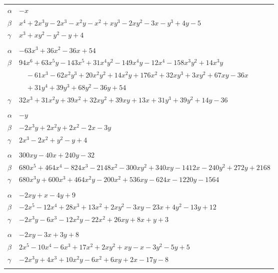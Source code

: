 \documentclass[11pt]{article}
\begin{document}
\begin{longtable}{@{}ll@{}}
$\alpha$ & $-x$\\
$\beta$ & $x^{4}+2x^{3}y-2x^{3}-x^{2}y-x^{2}+xy^{3}-2xy^{2}-3x-y^{3}+4y-5$\\
$\gamma$ & $x^{3}+xy^{2}-y^{2}-y+4$\\
\addlinespace[3pt]
\multicolumn{2}{@{}l}{$\{i,j\}=\{54,120\}$, $k_{ij}=2\cdot 3^{4}$}\\
$\alpha$ & $-63x^{3}+36x^{2}-36x+54$\\
$\beta$ & $94x^{6}+63x^{5}y-143x^{5}+31x^{4}y^{2}-149x^{4}y-12x^{4}-158x^{3}y^{2}+14x^{3}y$\\
 & $\quad -61x^{3}-62x^{2}y^{3}+20x^{2}y^{2}+14x^{2}y+176x^{2}+32xy^{3}+3xy^{2}+67xy-36x$\\
 & $\quad +31y^{4}+39y^{3}+68y^{2}-36y+54$\\
$\gamma$ & $32x^{3}+31x^{2}y+39x^{2}+32xy^{2}+39xy+13x+31y^{3}+39y^{2}+14y-36$\\
\addlinespace[3pt]
\multicolumn{2}{@{}l}{$\{i,j\}=\{58,59\}$, $k_{ij}=2^{2}$}\\
$\alpha$ & $-y$\\
$\beta$ & $-2x^{3}y+2x^{2}y+2x^{2}-2x-3y$\\
$\gamma$ & $2x^{3}-2x^{2}+y^{2}-y+4$\\
\addlinespace[3pt]
\multicolumn{2}{@{}l}{$\{i,j\}=\{59,166\}$, $k_{ij}=2^{3}\cdot 7\cdot 37$}\\
$\alpha$ & $300xy-40x+240y-32$\\
$\beta$ & $680x^{5}+464x^{4}-824x^{3}-2148x^{2}-300xy^{2}+340xy-1412x-240y^{2}+272y+2168$\\
$\gamma$ & $680x^{3}y+600x^{3}+464x^{2}y-200x^{2}+536xy-624x-1220y-1564$\\
\addlinespace[3pt]
\multicolumn{2}{@{}l}{$\{i,j\}=\{59,167\}$, $k_{ij}=2\cdot 3\cdot 7$}\\
$\alpha$ & $-2xy+x-4y+9$\\
$\beta$ & $-2x^{5}-12x^{4}+28x^{3}+13x^{2}+2xy^{2}-3xy-23x+4y^{2}-13y+12$\\
$\gamma$ & $-2x^{3}y-6x^{3}-12x^{2}y-22x^{2}+26xy+8x+y+3$\\
\addlinespace[3pt]
\multicolumn{2}{@{}l}{$\{i,j\}=\{59,169\}$, $k_{ij}=3\cdot 7$}\\
$\alpha$ & $-2xy-3x+3y+8$\\
$\beta$ & $2x^{5}-10x^{4}-6x^{3}+17x^{2}+2xy^{2}+xy-x-3y^{2}-5y+5$\\
$\gamma$ & $-2x^{3}y+4x^{3}+10x^{2}y-6x^{2}+6xy+2x-17y-8$\\
\addlinespace[3pt]
\multicolumn{2}{@{}l}{$\{i,j\}=\{62,91\}$, $k_{ij}=2^{6}\cdot 3^{6}\cdot 13$}\\

\end{longtable}
\end{document}
